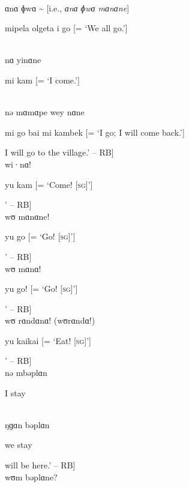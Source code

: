 \noindent [‘I will go.’ -- RB]\\

\noindent ɑnɑ ɸwɑ {\textasciitilde} [i.e., \textit{ɑnɑ ɸwɑ mɑnɑne}]

\noindent mipela olgeta i go [= ‘We all go.’]

\\

\noindent nɑ yinɑne

\noindent mi kam [= ‘I come.’]

\\

\noindent nə mɑmɑpe wey nɑne

\noindent mi go bai mi kambek [= ‘I go; I will come back.’]

\noindent [‘I went and stayed there, [but] I will go to the village.’ -- RB]\\

\noindent wi·nɑ!

\noindent yu kam [= ‘Come! [\textsc{sg}]’]

\noindent [‘Come! [\textsc{sg}]’ -- RB]\\

\noindent wʊ mɑnɑne!

\noindent yu go [= ‘Go! [\textsc{sg}]’]

\noindent [‘Go! [\textsc{sg}]’ -- RB]\\

\noindent wʊ mɑnɑ!

\noindent yu go! [= ‘Go! [\textsc{sg}]’]

\noindent [‘Go! [\textsc{sg}]’ -- RB]\\

\noindent wʊ rɑndɑnɑ! (wʊrɑndɑ!)

\noindent yu kaikai [= ‘Eat! [\textsc{sg}]’]

\noindent [‘Eat! [\textsc{sg}]’ -- RB]\\

\noindent nə mbəplɑn

\noindent I stay

\\

\noindent ŋɡɑn bəplɑn

\noindent we stay

\noindent [‘We [\textsc{du.excl}] will be here.’ -- RB]\\

\noindent wʊm bəplɑne?

